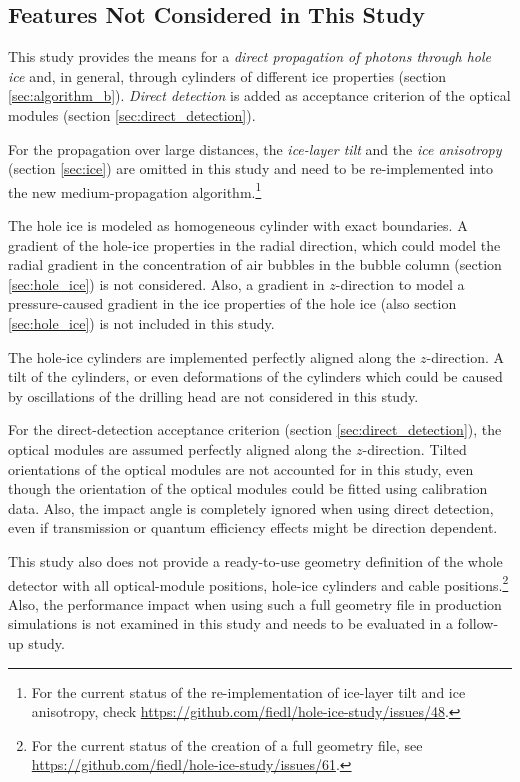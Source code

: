 \subsection{Features Not Considered in This Study}
\label{sec:ice_features_not_considered}

This study provides the means for a
\textit{direct propagation of photons through hole ice} and, in general,
through cylinders of different ice properties (section
\ref{sec:algorithm_b}). \textit{Direct detection} is added as acceptance
criterion of the optical modules (section \ref{sec:direct_detection}).

For the propagation over large distances, the \textit{ice-layer tilt}
and the \textit{ice anisotropy} (section \ref{sec:ice}) are omitted in
this study and need to be re-implemented into the new medium-propagation
algorithm.\footnote{For the current status of the re-implementation of ice-layer tilt and ice anisotropy, check \url{https://github.com/fiedl/hole-ice-study/issues/48}.}

The hole ice is modeled as homogeneous cylinder with exact boundaries. A
gradient of the hole-ice properties in the radial direction, which could
model the radial gradient in the concentration of air bubbles in the
bubble column (section \ref{sec:hole_ice}) is not considered. Also, a
gradient in \(z\)-direction to model a pressure-caused gradient in the
ice properties of the hole ice (also section \ref{sec:hole_ice}) is not
included in this study.

The hole-ice cylinders are implemented perfectly aligned along the
\(z\)-direction. A tilt of the cylinders, or even deformations of the
cylinders which could be caused by oscillations of the drilling head are
not considered in this study.

For the direct-detection acceptance criterion (section
\ref{sec:direct_detection}), the optical modules are assumed perfectly
aligned along the \(z\)-direction. Tilted orientations of the optical
modules are not accounted for in this study, even though the orientation
of the optical modules could be fitted using calibration data. Also, the
impact angle is completely ignored when using direct detection, even if
transmission or quantum efficiency effects might be direction dependent.

This study also does not provide a ready-to-use geometry definition of
the whole detector with all optical-module positions, hole-ice cylinders
and cable
positions.\footnote{For the current status of the creation of a full geometry file, see \url{https://github.com/fiedl/hole-ice-study/issues/61}.}
Also, the performance impact when using such a full geometry file in
production simulations is not examined in this study and needs to be
evaluated in a follow-up study.\followup
